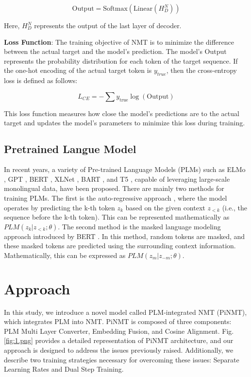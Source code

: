 \documentclass[conference]{IEEEtran}
\begin{document}
\begin{equation}
\text{Output} = \text{Softmax}(\text{Linear}(H_D^N))
\end{equation}

Here, $H_D^N$ represents the output of the last layer of decoder.

\textbf{Loss Function}: The training objective of NMT is to minimize the difference between the actual target and the model's prediction. The model's Output represents the probability distribution for each token of the target sequence. If the one-hot encoding of the actual target token is $y_{true}$, then the cross-entropy loss is defined as follows:

\begin{equation}
L_{CE} = -\sum y_{\text{true}} \log(\text{Output})
\end{equation}

This loss function measures how close the model's predictions are to the actual target and updates the model's parameters to minimize this loss during training.


\subsection{Pretrained Langue Model}
In recent years, a variety of Pre-trained Language Models (PLMs) such as ELMo \cite{peters2018elmo}, GPT \cite{radford2018gpt}, BERT \cite{devlin2019bert}, XLNet \cite{yang2019xlnet}, BART \cite{lewis2019bart}, and T5 \cite{raffel2020texttotext}, capable of leveraging large-scale monolingual data, have been proposed. There are mainly two methods for training PLMs. 
The first is the auto-regressive approach \cite{radford2018gpt}, where the model operates by predicting the k-th token $z_k$ based on the given context $z_{<k}$ (i.e., the sequence before the k-th token). This can be represented mathematically as $PLM(z_k | z_{<k}; \theta)$.
The second method is the masked language modeling approach introduced by BERT \cite{devlin2019bert}. In this method, random tokens are masked, and these masked tokens are predicted using the surrounding context information. Mathematically, this can be expressed as $PLM(z_m | z_{-m}; \theta)$.






\section{Approach}
In this study, we introduce a novel model called PLM-integrated NMT (PiNMT), which integrates PLM into NMT. PiNMT is composed of three components: PLM Multi Layer Converter, Embedding Fusion, and Cosine Alignment. Fig. \ref{fig:1.png} provides a detailed representation of PiNMT architecture, and our approach is designed to address the issues previously raised. Additionally, we describe two training strategies necessary for overcoming these issues: Separate Learning Rates and Dual Step Training.
\end{document}
